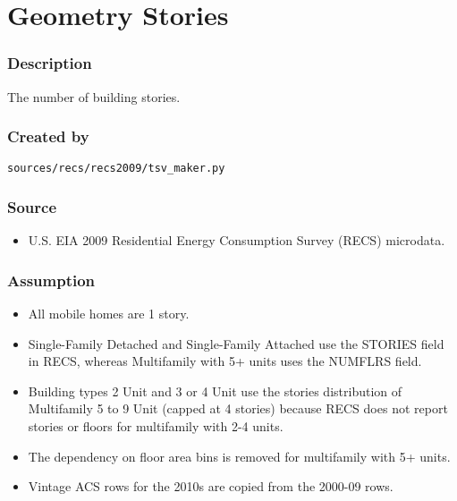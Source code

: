 \section{Geometry Stories}\label{geometry_stories}

\subsubsection{Description}\label{description-57}

The number of building stories.

\subsubsection{Created by}\label{created-by-57}

\texttt{sources/recs/recs2009/tsv\_maker.py}

\subsubsection{Source}\label{source-56}

\begin{itemize}
 
\item
  U.S. EIA 2009 Residential Energy Consumption Survey (RECS) microdata.
\end{itemize}

\subsubsection{Assumption}\label{assumption-31}

\begin{itemize}
 
\item
  All mobile homes are 1 story.
\item
  Single-Family Detached and Single-Family Attached use the STORIES
  field in RECS, whereas Multifamily with 5+ units uses the NUMFLRS
  field.
\item
  Building types 2 Unit and 3 or 4 Unit use the stories distribution of
  Multifamily 5 to 9 Unit (capped at 4 stories) because RECS does not
  report stories or floors for multifamily with 2-4 units.
\item
  The dependency on floor area bins is removed for multifamily with 5+
  units.
\item
  Vintage ACS rows for the 2010s are copied from the 2000-09 rows.
\end{itemize}

